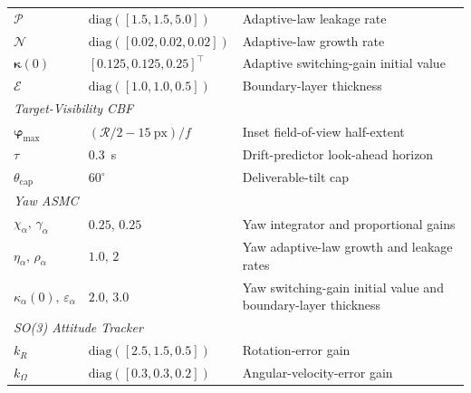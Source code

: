 \documentclass{IEEEtaes}
\begin{document}
\begin{table}[!t]
\begin{tabular}{p{} p{} p{}}
        $\mathcal{P}$           & $\text{diag}([1.5,1.5,5.0])$ & Adaptive-law leakage rate \\
        $\mathcal{N}$           & $\text{diag}([0.02,0.02,0.02])$ & Adaptive-law growth rate \\
        $\boldsymbol{\kappa}(0)$ & $[0.125,0.125,0.25]^\top$ & Adaptive switching-gain initial value \\
        $\mathcal{E}$           & $\text{diag}([1.0,1.0,0.5])$ & Boundary-layer thickness \\
    \midrule
        \multicolumn{3}{l}{\textit{Target-Visibility CBF}} \\
        $\boldsymbol{\varphi}_\text{max}$ & $(\mathcal{R}/2-15~\text{px})/f$ & Inset field-of-view half-extent \\
        $\tau$                      & $0.3$~s & Drift-predictor look-ahead horizon \\
        $\theta_\text{cap}$         & $60^\circ$ & Deliverable-tilt cap \\
    \midrule
        \multicolumn{3}{l}{\textit{Yaw ASMC}} \\
        $\chi_\alpha,\,\gamma_\alpha$       & $0.25,\,0.25$ & Yaw integrator and proportional gains \\
        $\eta_\alpha,\,\rho_\alpha$         & $1.0,\,2$ & Yaw adaptive-law growth and leakage rates \\
        $\kappa_{\alpha}(0),\,\varepsilon_\alpha$ & $2.0,\,3.0$ & Yaw switching-gain initial value and boundary-layer thickness \\
    \midrule
        \multicolumn{3}{l}{\textit{SO(3) Attitude Tracker}} \\
        $k_R$      & $\text{diag}([2.5,1.5,0.5])$ & Rotation-error gain \\
        $k_\Omega$ & $\text{diag}([0.3,0.3,0.2])$ & Angular-velocity-error gain \\
    \bottomrule
    \end{tabular}
\end{table}
\end{document}
